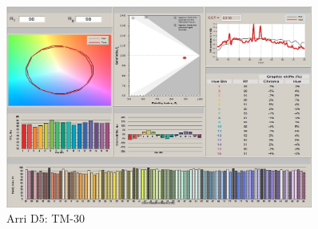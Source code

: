 \begin{figure}[htp]     %
\centering
\includegraphics[width=0.9\textwidth]{vormessung/arriD5vortm} 
\caption {Arri D5: TM-30} 
\end{figure}




